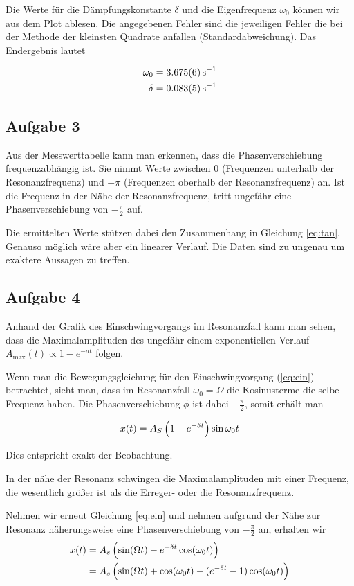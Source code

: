 \documentclass[a4paper,german,12pt,smallheadings]{scrartcl}
\begin{document}
Die Werte für die Dämpfungskonstante $\delta$ und die Eigenfrequenz $\omega_0$
können wir aus dem Plot ablesen.  Die angegebenen Fehler sind die jeweiligen
Fehler die bei der Methode der kleinsten Quadrate anfallen
(Standardabweichung). Das Endergebnis lautet

\begin{align}
  \omega_0 &= \SI{3,675+-0.006}{s^{-1}} \\
  \delta &= \SI{0.083+-0.005}{s^{-1}}
\end{align}

\subsection{Aufgabe 3}
Aus der Messwerttabelle kann man erkennen, dass die Phasenverschiebung
frequenzabhängig ist. Sie nimmt Werte zwischen $0$ (Frequenzen unterhalb der
Resonanzfrequenz) und $-\pi$ (Frequenzen oberhalb der Resonanzfrequenz) an. Ist
die Frequenz in der Nähe der Resonanzfrequenz, tritt ungefähr eine
Phasenverschiebung von $-\frac{\pi}{2}$ auf.

Die ermittelten Werte stützen dabei den Zusammenhang in Gleichung \ref{eq:tan}.
Genauso möglich wäre aber ein linearer Verlauf. Die Daten sind zu ungenau um
exaktere Aussagen zu treffen.

\subsection{Aufgabe 4}
Anhand der Grafik des Einschwingvorgangs im Resonanzfall kann man sehen, dass
die Maximalamplituden des ungefähr einem exponentiellen Verlauf
$A_\text{max}(t) \propto 1 - e^{- a t}$ folgen.

Wenn man die Bewegungsgleichung für den Einschwingvorgang
(\ref{eq:ein}) betrachtet, sieht man, dass im Resonanzfall $\omega_0 = \Omega$
die Kosinusterme die selbe Frequenz haben. Die Phasenverschiebung $\phi$ ist
dabei $-\frac{\pi}{2}$, somit erhält man

\begin{equation}
  x(t) = A_S \del{1 - e^{-\delta t}} \sin \omega_0 t
\end{equation}

Dies entspricht exakt der Beobachtung.

In der nähe der Resonanz schwingen die Maximalamplituden mit einer Frequenz,
die wesentlich größer ist als die Erreger- oder die Resonanzfrequenz.

Nehmen wir erneut Gleichung \ref{eq:ein} und nehmen aufgrund der Nähe zur
Resonanz näherungsweise eine Phasenverschiebung von $-\frac{\pi}{2}$ an,
erhalten wir
\begin{align}
  x(t) &= A_s \del{\sin(\Omega t) - e^{-\delta t} \cos(\omega_0 t)} \\
       &= A_s \del{\sin(\Omega t) + \cos(\omega_0 t) - (e^{-\delta t} - 1) \cos(\omega_0 t)}
\end{align}
\end{document}

